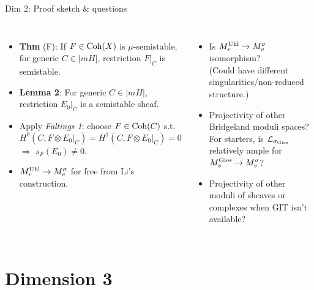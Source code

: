 \documentclass[8pt,handout]{beamer} %
\begin{document}
\begin{frame}[fragile]{Dim 2: Proof sketch \& questions}
\begin{columns}[t]
        \begin{itemize}
            \item<6-> \textbf{Thm} (F): If $F \in \mathrm{Coh}(X)$ is $\mu$-semistable, for generic $C \in |m H|$, restriction $F|_C$ is semistable.
            \item<7-> \textbf{Lemma 2}: For generic $C \in |m H|$, restriction $E_0|_C$ is a semistable sheaf.
            \item<8-> Apply \textit{Faltings 1}: choose $F \in \mathrm{Coh}(C)$ s.t. 
            \[ H^0(C, F \otimes E_0|_C) = H^1(C, F \otimes E_0|_C) = 0 \]
            $\Rightarrow$ $s_F(E_0) \neq 0$.
            \item<9-> $M^{\text{Uhl}}_v \to M^\sigma_v$ for free from Li's construction.
        \end{itemize}
        \begin{itemize}
            \item<11-> Is $M^{\text{Uhl}}_v \to M^\sigma_v$ isomorphism? \\ {\footnotesize (Could have different singularities/non-reduced structure.)}
            \item<12-> Projectivity of other Bridgeland moduli spaces? For starters, is $\mathcal{L}_{\sigma_\text{Gies}}$ relatively ample for $M^{\text{Gies}}_v \to M^\sigma_v$?
            \item<13-> Projectivity of other moduli of sheaves or complexes when GIT isn't available?
        \end{itemize}
    \end{columns}
\end{frame}

\section{Dimension 3}
\end{document}
